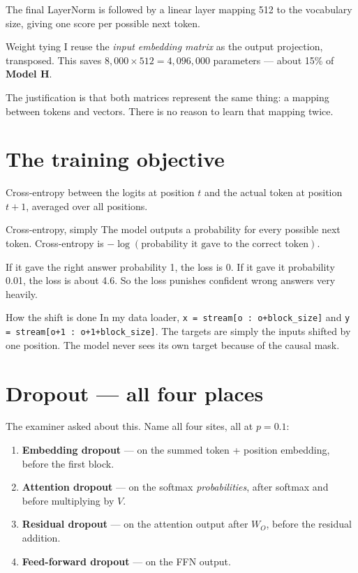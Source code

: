 \documentclass[11pt]{report}
\newcommand{\p}[1]{\texttt{#1}}
\newcommand{\MH}{\textcolor{hindiblue}{\textbf{Model H}}}
\begin{document}
The final LayerNorm is followed by a linear layer mapping 512 to the vocabulary
size, giving one score per possible next token.

\begin{implementation}{Weight tying}
I reuse the \emph{input embedding matrix} as the output projection, transposed.
This saves $8{,}000 \times 512 = 4{,}096{,}000$ parameters --- about 15\% of
\MH.

The justification is that both matrices represent the same thing: a mapping
between tokens and vectors. There is no reason to learn that mapping twice.
\end{implementation}

\section{The training objective}

Cross-entropy between the logits at position $t$ and the actual token at
position $t+1$, averaged over all positions.

\begin{concept}{Cross-entropy, simply}
The model outputs a probability for every possible next token. Cross-entropy
is $-\log(\text{probability it gave to the correct token})$.

If it gave the right answer probability 1, the loss is 0. If it gave it
probability 0.01, the loss is about 4.6. So the loss punishes confident wrong
answers very heavily.
\end{concept}

\begin{implementation}{How the shift is done}
In my data loader, \p{x = stream[o : o+block\_size]} and
\p{y = stream[o+1 : o+1+block\_size]}. The targets are simply the inputs shifted
by one position. The model never sees its own target because of the causal mask.
\end{implementation}

\section{Dropout --- all four places}

The examiner asked about this. Name all four sites, all at $p = 0.1$:

\begin{enumerate}[leftmargin=*]
\item \textbf{Embedding dropout} --- on the summed token + position embedding,
      before the first block.
\item \textbf{Attention dropout} --- on the softmax \emph{probabilities}, after
      softmax and before multiplying by $V$.
\item \textbf{Residual dropout} --- on the attention output after $W_O$, before
      the residual addition.
\item \textbf{Feed-forward dropout} --- on the FFN output.
\end{enumerate}
\end{document}

